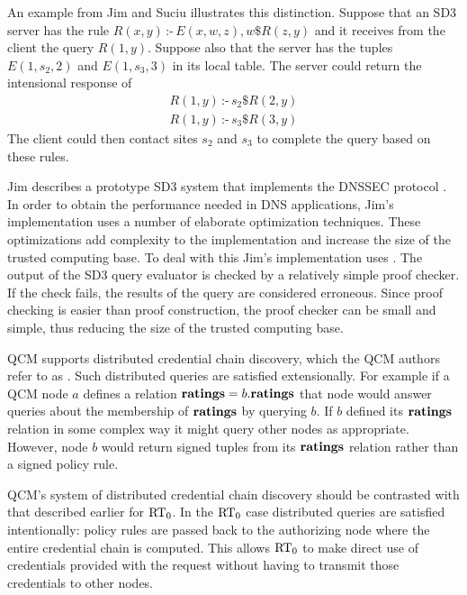 An example from Jim and Suciu \cite{Jim:DDQE} illustrates this distinction.
Suppose that an SD3 server has the rule $R(x,y)\,\texttt{:-}\,E(x, w, z),
w\$R(z, y)$ and it receives from the client the query $R(1, y)$. Suppose
also that the server has the tuples $E(1, s_2, 2)$ and $E(1, s_3, 3)$ in
its local table. The server could return the intensional response of
\begin{displaymath}
\begin{array}{c}
R(1, y)\,\texttt{:-}\,s_2\$R(2, y) \\
R(1, y)\,\texttt{:-}\,s_3\$R(3, y)
\end{array}
\end{displaymath}
The client could then contact sites $s_2$ and $s_3$ to complete the
query based on these rules.  

Jim describes a prototype SD3 system that implements the DNSSEC protocol
\cite{Jim:STMSCE}. In order to obtain the performance needed in DNS
applications, Jim's implementation uses a number of elaborate optimization
techniques. These optimizations add complexity to the implementation and
increase the size of the trusted computing base. To deal with this Jim's
implementation uses . The output of the SD3
query evaluator is checked by a relatively simple proof checker. If the
check fails, the results of the query are considered erroneous. Since proof
checking is easier than proof construction, the proof checker can be small
and simple, thus reducing the size of the trusted computing base.

QCM supports distributed credential chain discovery, which the QCM authors
refer to as 
\cite{Gunter:PDCR}. Such distributed queries are satisfied extensionally.
For example if a QCM node $a$ defines a relation $\text{\bf ratings} =
b.\text{\bf ratings}$ that node would answer queries about the membership
of $\text{\bf ratings}$ by querying $b$. If $b$ defined its $\text{\bf
ratings}$ relation in some complex way it might query other nodes as
appropriate. However, node $b$ would return signed tuples from its
$\text{\bf ratings}$ relation rather than a signed policy rule.

QCM's system of distributed credential chain discovery should be contrasted
with that described earlier for $\text{RT}_0$. In the $\text{RT}_0$ case distributed
queries are satisfied intentionally: policy rules are passed back to the
authorizing node where the entire credential chain is computed. This allows
$\text{RT}_0$ to make direct use of credentials provided with the request without
having to transmit those credentials to other nodes. 

